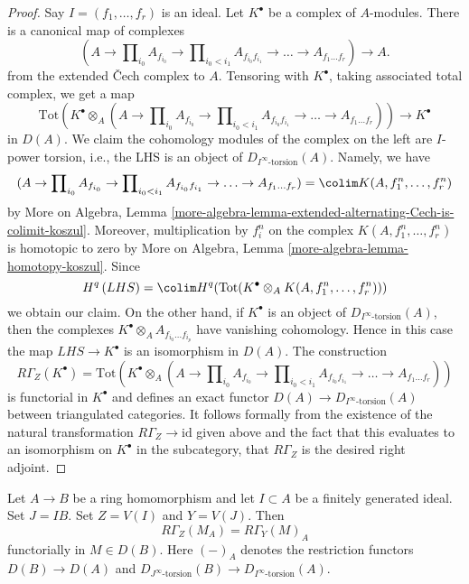 \begin{proof}
Say $I = (f_1, \ldots, f_r)$ is an ideal.
Let $K^\bullet$ be a complex of $A$-modules.
There is a canonical map of complexes
$$
(A \to \prod\nolimits_{i_0} A_{f_{i_0}} \to
\prod\nolimits_{i_0 < i_1} A_{f_{i_0}f_{i_1}} \to
\ldots \to A_{f_1\ldots f_r}) \longrightarrow A.
$$
from the extended {\v C}ech complex to $A$.
Tensoring with $K^\bullet$, taking associated total complex,
we get a map
$$
\text{Tot}\left(
K^\bullet \otimes_A
(A \to \prod\nolimits_{i_0} A_{f_{i_0}} \to
\prod\nolimits_{i_0 < i_1} A_{f_{i_0}f_{i_1}} \to
\ldots \to A_{f_1\ldots f_r})\right)
\longrightarrow
K^\bullet
$$
in $D(A)$. We claim the cohomology modules of the complex on the left are
$I$-power torsion, i.e., the LHS is an object of
$D_{I^\infty\text{-torsion}}(A)$. Namely, we have
$$
(A \to \prod\nolimits_{i_0} A_{f_{i_0}} \to
\prod\nolimits_{i_0 < i_1} A_{f_{i_0}f_{i_1}} \to
\ldots \to A_{f_1\ldots f_r}) = \colim K(A, f_1^n, \ldots, f_r^n)
$$
by More on Algebra, Lemma
\ref{more-algebra-lemma-extended-alternating-Cech-is-colimit-koszul}.
Moreover, multiplication by $f_i^n$ on the complex
$K(A, f_1^n, \ldots, f_r^n)$ is homotopic to zero by
More on Algebra, Lemma \ref{more-algebra-lemma-homotopy-koszul}.
Since
$$
H^q\left( LHS \right) =
\colim H^q(\text{Tot}(K^\bullet \otimes_A K(A, f_1^n, \ldots, f_r^n)))
$$
we obtain our claim. On the other hand, if $K^\bullet$ is an
object of $D_{I^\infty\text{-torsion}}(A)$, then the complexes
$K^\bullet \otimes_A A_{f_{i_0} \ldots f_{i_p}}$ have vanishing
cohomology. Hence in this case the map $LHS \to K^\bullet$
is an isomorphism in $D(A)$. The construction
$$
R\Gamma_Z(K^\bullet) =
\text{Tot}\left(
K^\bullet \otimes_A
(A \to \prod\nolimits_{i_0} A_{f_{i_0}} \to
\prod\nolimits_{i_0 < i_1} A_{f_{i_0}f_{i_1}} \to
\ldots \to A_{f_1\ldots f_r})\right)
$$
is functorial in $K^\bullet$ and defines an exact functor
$D(A) \to D_{I^\infty\text{-torsion}}(A)$ between
triangulated categories. It follows formally from the
existence of the natural transformation $R\Gamma_Z \to \text{id}$
given above and the fact that this evaluates to an isomorphism
on $K^\bullet$ in the subcategory, that $R\Gamma_Z$ is the desired
right adjoint.
\end{proof}

\begin{lemma}
\label{lemma-local-cohomology-and-restriction}
Let $A \to B$ be a ring homomorphism and let $I \subset A$
be a finitely generated ideal. Set $J = IB$. Set $Z = V(I)$
and $Y = V(J)$. Then
$$
R\Gamma_Z(M_A) = R\Gamma_Y(M)_A
$$
functorially in $M \in D(B)$. Here $(-)_A$ denotes the restriction
functors $D(B) \to D(A)$ and
$D_{J^\infty\text{-torsion}}(B) \to D_{I^\infty\text{-torsion}}(A)$.
\end{lemma}

